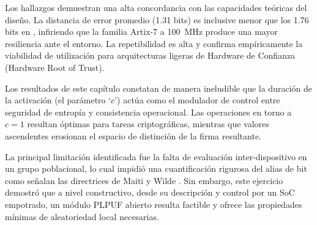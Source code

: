 Los hallazgos demuestran una alta concordancia con las capacidades teóricas del
diseño. La distancia de error promedio (1.31 bits) es inclusive menor que los 1.76
bits en \cite{hori_2011_pseudolfsr}, infiriendo que la familia Artix-7 a 100~MHz
produce una mayor resiliencia ante el entorno. La repetibilidad es alta
y confirma empíricamente la viabilidad de utilización para arquitecturas ligeras de
Hardware de Confianza (Hardware Root of Trust).

Los resultados de este capítulo constatan de manera ineludible que la duración
de la activación (el parámetro `$c$') actúa como el modulador de control entre
seguridad de entropía y consistencia operacional. Las operaciones en torno a
$c=1$ resultan óptimas para tareas criptográficas, mientras que valores ascendentes
erosionan el espacio de distinción de la firma resultante.

La principal limitación identificada fue la falta de evaluación
inter-dispositivo en un grupo poblacional, lo cual impidió una cuantificación
rigurosa del alias de bit como señalan las directrices de Maiti y Wilde
\cite{maiti_2012_systematic, wilde_2020_confidence}. Sin embargo, este
ejercicio demostró que a nivel constructivo, desde su descripción y control
por un SoC empotrado, un módulo PLPUF abierto resulta factible y ofrece las
propiedades mínimas de aleatoriedad local necesarias.

